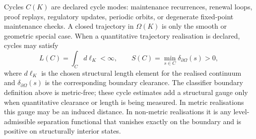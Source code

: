 Cycles \(C(K)\) are declared cycle modes: maintenance recurrences, renewal
loops, proof replays, regulatory updates, periodic orbits, or degenerate
fixed-point maintenance checks. A closed trajectory in \(\Omega(K)\) is only
the smooth or geometric special case.
When a quantitative trajectory realisation is declared, cycles may satisfy
\[
    L(C) = \int_C d\ell_K < \infty,\qquad
    S(C) = \min_{s \in C} \delta_{\partial\Omega}(s) > 0,
\]
where \(d\ell_K\) is the chosen structural length element for the realised
continuum and \(\delta_{\partial\Omega}(s)\) is the corresponding boundary
clearance.
The classifier boundary definition above is metric-free; these cycle estimates
add a structural gauge only when quantitative clearance or length is being measured.
In metric realisations this gauge may be an induced distance. In non-metric
realisations it is any level-admissible separation functional that vanishes
exactly on the boundary and is positive on structurally interior states.

